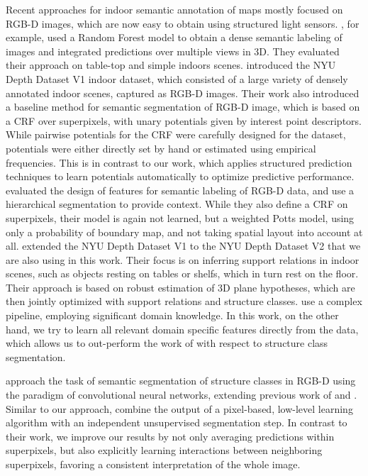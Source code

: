 Recent approaches for indoor semantic annotation of maps mostly focused on
RGB-D images, which are now easy to obtain using structured light sensors.
\citet{stuckler2012semantic}, for example, used a Random Forest model to obtain a dense
semantic labeling of images and integrated predictions over multiple views in 3D.
They evaluated their approach on table-top and simple indoors scenes.
%
\citet{silberman2011indoor} introduced the NYU Depth Dataset V1 indoor dataset,
which consisted of a large variety of densely annotated indoor scenes, captured as RGB-D images.
Their work also introduced a baseline method for semantic segmentation of RGB-D
image, which is based on a CRF over superpixels, with unary potentials given by interest point descriptors.
While pairwise potentials for the CRF were carefully
designed for the dataset, potentials were either directly set by hand or estimated using empirical
frequencies. This is in contrast to our work, which applies structured prediction techniques
to learn potentials automatically to optimize predictive performance.
%
\citet{ren2012rgb} evaluated the design of features for semantic labeling of
RGB-D data, and use a hierarchical segmentation to provide context. While they
also define a CRF on superpixels, their model is again not learned, but a
weighted Potts model, using only a probability of boundary map, and not taking
spatial layout into account at all.
%
\citet{SilbermanECCV12} extended the NYU Depth Dataset V1 to the NYU Depth Dataset V2 that we are also
using in this work.  Their focus is on inferring support relations in indoor
scenes, such as objects resting on tables or shelfs, which in turn rest on the floor.
Their approach is based on robust estimation of 3D plane hypotheses, which are then jointly
optimized with support relations and structure classes.
\citet{SilbermanECCV12} use a complex pipeline, employing significant domain knowledge.
In this work, on the other hand, we try to learn all relevant domain specific features
directly from the data, which allows us to out-perform the work of \citet{SilbermanECCV12}
with respect to structure class segmentation.

\citet{couprie-iclr-13} approach the task of semantic segmentation of structure classes
in RGB-D using the paradigm of convolutional neural networks, extending
previous work of \citet{farabet-pami-13} and \citet{schulz2012learning}.
Similar to our approach, \citet{couprie-iclr-13} combine the output of a
pixel-based, low-level learning algorithm with an independent unsupervised
segmentation step. In contrast to their work, we improve our results by not
only averaging predictions within superpixels, but also explicitly learning
interactions between neighboring superpixels, favoring a consistent
interpretation of the whole image.

